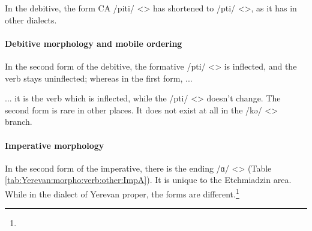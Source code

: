 In the debitive, the form CA /piti/ <> has shortened to /pti/ <>, as it has in other dialects. 


\paragraph{Debitive morphology and mobile ordering}

In the second form of the debitive, the formative /pti/ <> is inflected, and the verb stays uninflected; whereas in the first form, ... 

\begin{adjarianpage}\label{page:44}\end{adjarianpage}%

... it is the verb which is inflected, while the /pti/ <> doesn't change. The second form is rare in other places. It does not exist at all in the /kə/ <> branch. 

\paragraph{Imperative morphology}
In the second form of the imperative, there is the ending /ɑ/ <> (Table \ref{tab:Yerevan:morpho:verb:other:ImpA}). It is unique to the Etchmiadzin area. While in the dialect of Yerevan proper, the forms are different.\footnote{} 




